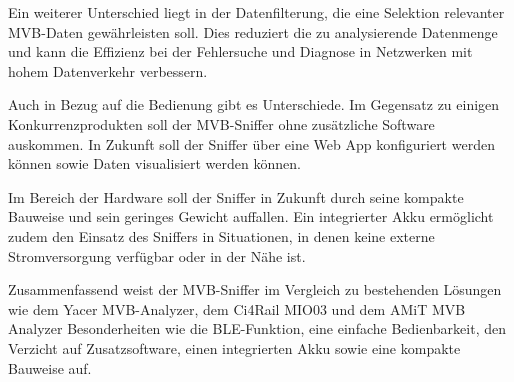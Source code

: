Ein weiterer Unterschied liegt in der Datenfilterung, die eine Selektion relevanter MVB-Daten gewährleisten soll. Dies reduziert die zu analysierende Datenmenge und kann die Effizienz bei der Fehlersuche und Diagnose in Netzwerken mit hohem Datenverkehr verbessern.

Auch in Bezug auf die Bedienung gibt es Unterschiede. Im Gegensatz zu einigen Konkurrenzprodukten soll der MVB-Sniffer ohne zusätzliche Software auskommen. In Zukunft soll der Sniffer über eine Web App konfiguriert werden können sowie Daten visualisiert werden können.

Im Bereich der Hardware soll der Sniffer in Zukunft durch seine kompakte Bauweise und sein geringes Gewicht auffallen. Ein integrierter Akku ermöglicht zudem den Einsatz des Sniffers in Situationen, in denen keine externe Stromversorgung verfügbar oder in der Nähe ist.

Zusammenfassend weist der MVB-Sniffer im Vergleich zu bestehenden Lösungen wie dem Yacer MVB-Analyzer, dem Ci4Rail MIO03 und dem AMiT MVB Analyzer Besonderheiten wie die BLE-Funktion, eine einfache Bedienbarkeit, den Verzicht auf Zusatzsoftware, einen integrierten Akku sowie eine kompakte Bauweise auf.